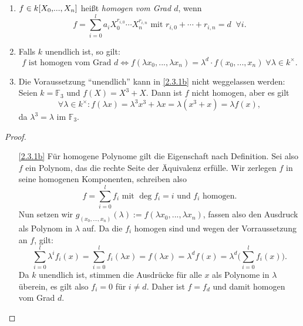 \documentclass[a4paper,12pt,index=toc]{scrbook}
\theoremstyle{keinenummern} %
\newcommand{\FF}{\mathbb{F}}
\let\olddotsc\dotsc %
\renewcommand{\dotsc}{\ensuremath{\!...}}
\newcommand{\ppolyx}[1][n]{\ensuremath%
  [X_{0},\dotsc,X_{#1}]}
\begin{document}
\begin{erinnerung}\label{2.3.1}\begin{enumerate}
\item{} $f\in k\ppolyx$ heißt \emph{homogen vom Grad $d$}, wenn
\begin{equation*}f=\sum_{i=0}^{l}a_{i}X_{0}^{r_{i,0}}\dotsm X_{n}^{r_{i,n}}\text{ mit }r_{i,0}+\dotsm+r_{i,n}=d\;\;\forall i.\end{equation*}
\item{} Falls $k$ unendlich ist, so gilt:
\begin{equation*}f\text{ ist homogen vom Grad }d\iff f(\lambda x_{0},\dotsc,\lambda x_{n}) = \lambda^{d}\cdot f(x_{0},\dotsc,x_{n})\;\forall\lambda\in k^{\times}.\end{equation*}
\item{} Die Voraussetzung \enquote{unendlich} kann in \ref{2.3.1b} nicht weggelassen werden: Seien $k=\FF_{3}$ und $f(X)=X^{3}+X$. Dann ist $f$ nicht homogen, aber es gilt
\begin{equation*}\forall\lambda\in k^{\times}\colon  f(\lambda x)=\lambda^{3}x^{3}+\lambda x=\lambda(x^{3}+x)=\lambda f(x),\end{equation*}
da $\lambda^{3}=\lambda$ im $\FF_{3}$.
\end{enumerate}\end{erinnerung}
\begin{proof}\begin{enumerate}
\item[\ref{2.3.1b}] Für homogene Polynome gilt die Eigenschaft nach Definition. Sei also $f$ ein Polynom, das die rechte Seite der Äquivalenz erfülle. Wir zerlegen $f$ in seine homogenen Komponenten, schreiben also
\begin{equation*}f=\sum_{i=0}^{l}f_{i}\text{ mit }\deg{f_{i}}=i\text{ und }f_{i}\text{ homogen.}\end{equation*}
Nun setzen wir $g_{(x_{0},\olddotsc,x_{n})}(\lambda):=f(\lambda x_{0},\dotsc,\lambda x_{n})$, fassen also den Ausdruck als Polynom in $\lambda$ auf. Da die $f_{i}$ homogen sind und wegen der Vorraussetzung an $f$, gilt:\vspace*{-10pt}
\begin{equation*}\sum_{i=0}^{l}\lambda^{i}f_{i}(x) = \sum_{i=0}^{l}f_{i}(\lambda x) = f(\lambda x)=\lambda^{d}f(x) = \lambda^{d}\biggl(\sum_{i=0}^{l}f_{i}(x)\biggr).\end{equation*}
Da $k$ unendlich ist, stimmen die Ausdrücke für alle $x$ als Polynome in $\lambda$ überein, es gilt also $f_{i}=0$ für $i\neq d$. Daher ist $f=f_{d}$ und damit homogen vom Grad $d$.
\end{enumerate}\end{proof}
\end{document}
